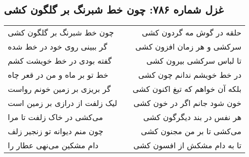 \begin{center}
\section*{غزل شماره ۷۸۶: چون خط شبرنگ بر گلگون کشی}
\label{sec:786}
\begin{longtable}{l p{0.5cm} r}
چون خط شبرنگ بر گلگون کشی
&&
حلقه در گوش مه گردون کشی
\\
گر ببینی روی خود در خط شده
&&
سرکشی و هر زمان افزون کشی
\\
گفته بودی در خط خویشت کشم
&&
تا لباس سرکشی بیرون کشی
\\
خط تو بر ماه و من در قعر چاه
&&
در خط خویشم ندانم چون کشی
\\
گر بریزی بر زمین خونم رواست
&&
بلکه آن خواهم که تیغ اکنون کشی
\\
لیک زلفت از درازی بر زمین است
&&
خون شود جانم اگر در خون کشی
\\
می‌کشی در خاک زلفت تا مرا
&&
هر نفس در بند دیگرگون کشی
\\
چون منم دیوانه تو زنجیر زلف
&&
می‌کشی تا بر من مجنون کشی
\\
دام مشکین می‌نهی عطار را
&&
تا به دام مشکش از افسون کشی
\\
\end{longtable}
\end{center}
